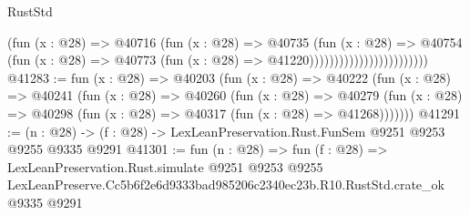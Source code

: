 \begin{lexlean}{RustStd}
\begin{coremodule}
                                          (fun (x : @28) =>
                                          @40716
                                            (fun (x : @28) =>
                                            @40735
                                              (fun (x : @28) =>
                                              @40754
                                                (fun (x : @28) =>
                                                @40773
                                                  (fun (x : @28) => @41220))))))))))))))))))))))))
@41283 := fun (x : @28) =>
  @40203
    (fun (x : @28) =>
    @40222
      (fun (x : @28) =>
      @40241
        (fun (x : @28) =>
        @40260
          (fun (x : @28) =>
          @40279 (fun (x : @28) => @40298 (fun (x : @28) => @40317 (fun (x : @28) => @41268)))))))
@41291 := (n : @28) -> (f : @28) -> LexLeanPreservation.Rust.FunSem @9251 @9253 @9255 @9335 @9291
@41301 := fun (n : @28) =>
  fun (f : @28) =>
  LexLeanPreservation.Rust.simulate
    @9251
    @9253
    @9255
    LexLeanPreserve.Cc5b6f2e6d9333bad985206c2340ec23b.R10.RustStd.crate_ok
    @9335
    @9291
\end{coremodule}
\end{lexlean}
